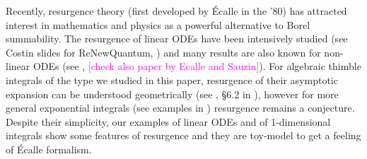 \documentclass{article}
\theoremstyle{definition}
\begin{document}
 
Recently, resurgence theory (first developed by \'Ecalle in the '80) has attracted interest in mathematics and physics as a powerful alternative to Borel summability. The resurgence of linear ODEs have been intensively studied (see Costin slides for ReNewQuantum, \cite{EcalleIII,loday1994stokes}) and many results are also known for non-linear ODEs (see \cite{schiappa-PI}, \cite{costin-PI} \textcolor{magenta}{[check also paper by Ecalle and Sauzin]}). For algebraic thimble integrals of the type we studied in this paper, resurgence of their asymptotic expansion can be understood geometrically (see \cite{Maxim_slide_ERC}, \S 6.2 in \cite{kontsevich2022analyticity}), however for more general exponential integrals (see examples in \cite{Maxim_slide_ERC}) resurgence remains a conjecture. Despite their simplicity, our examples of linear ODEs and of 1-dimensional integrals show some features of resurgence and they are toy-model to get a feeling of \'Ecalle formalism. 
\end{document}
